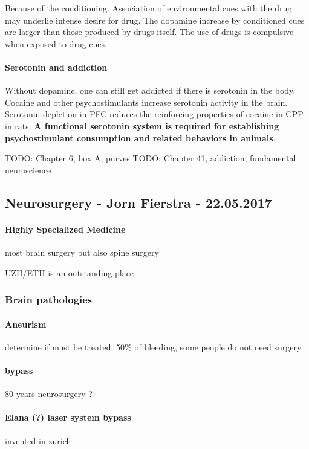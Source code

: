 \documentclass[12pt,article,oneside,a4paper]{memoir}
\begin{document}
Because of the conditioning. Association of environmental cues with the drug may underlie intense desire for drug. The dopamine increase by conditioned cues are larger than those produced by drugs itself. The use of drugs is compulsive when exposed to drug cues.

\paragraph{Serotonin and addiction}
Without dopamine, one can still get addicted if there is serotonin in the body. Cocaine and other psychostimulants increase serotonin activity in the brain. Serotonin depletion in PFC reduces the reinforcing properties of cocaine in CPP in rats. \textbf{A functional serotonin system is required for establishing psychostimulant consumption and related behaviors in animals}.

TODO: Chapter 6, box A, purves
TODO: Chapter 41, addiction, fundamental neuroscience

\newpage
\subsection{Neurosurgery - Jorn Fierstra - 22.05.2017}
\paragraph{Highly Specialized Medicine} most brain surgery but also spine surgery

UZH/ETH is an outstanding place

\subsubsection{Brain pathologies}
\paragraph{Aneurism} determine if must be treated. 50\% of bleeding, some people do not need surgery.
\paragraph{bypass} 80 years neurosurgery ?
\paragraph{Elana (?) laser system bypass} invented in zurich
\end{document}
